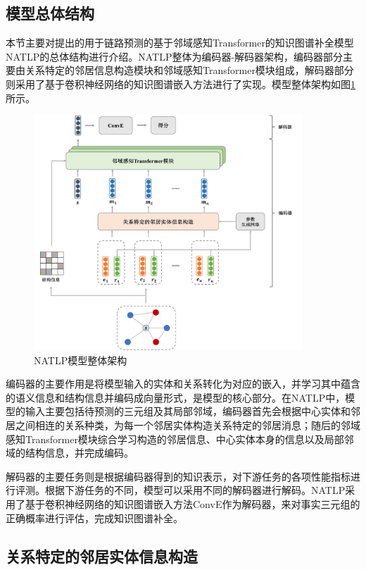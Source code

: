 \subsection{模型总体结构}

本节主要对提出的用于链路预测的基于邻域感知Transformer的知识图谱补全模型NATLP的总体结构进行介绍。NATLP整体为编码器-解码器架构，编码器部分主要由关系特定的邻居信息构造模块和邻域感知Transformer模块组成，解码器部分则采用了基于卷积神经网络的知识图谱嵌入方法进行了实现。模型整体架构如图\ref{architecture}所示。

\begin{figure}[htb]
  \centerline{\includegraphics[width=0.9\textwidth]{pic/architecture.pdf}}
  \caption{NATLP模型整体架构}
  \label{architecture}
\end{figure}

编码器的主要作用是将模型输入的实体和关系转化为对应的嵌入，并学习其中蕴含的语义信息和结构信息并编码成向量形式，是模型的核心部分。在NATLP中，模型的输入主要包括待预测的三元组及其局部邻域，编码器首先会根据中心实体和邻居之间相连的关系种类，为每一个邻居实体构造关系特定的邻居消息；随后的邻域感知Transformer模块综合学习构造的邻居信息、中心实体本身的信息以及局部邻域的结构信息，并完成编码。

解码器的主要任务则是根据编码器得到的知识表示，对下游任务的各项性能指标进行评测。根据下游任务的不同，模型可以采用不同的解码器进行解码。NATLP采用了基于卷积神经网络的知识图谱嵌入方法ConvE作为解码器，来对事实三元组的正确概率进行评估，完成知识图谱补全。

\subsection{关系特定的邻居实体信息构造}

